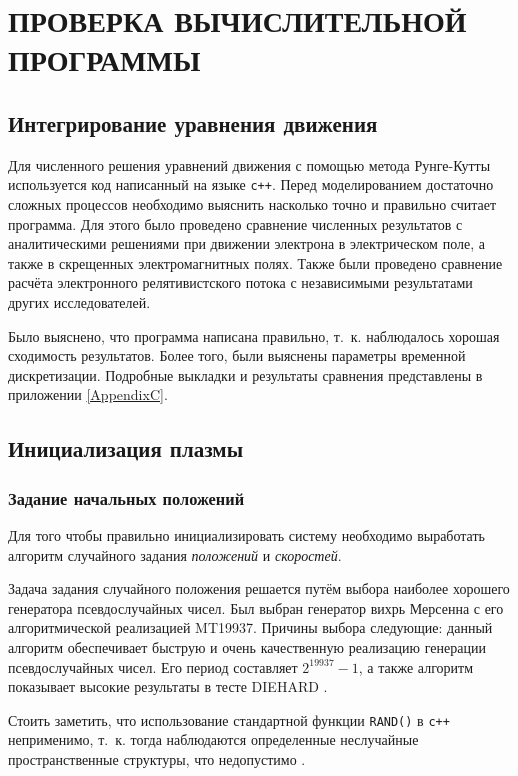 \chapter{ПРОВЕРКА ВЫЧИСЛИТЕЛЬНОЙ ПРОГРАММЫ} \label{ch4}

\section{Интегрирование уравнения движения}

Для численного решения уравнений движения с помощью метода Рунге-Кутты используется код написанный на языке \texttt{c++}.
Перед моделированием достаточно сложных процессов необходимо выяснить насколько точно и правильно считает программа. Для этого было проведено сравнение численных результатов с аналитическими решениями при движении электрона в электрическом поле, а также в скрещенных электромагнитных полях. Также были проведено сравнение расчёта электронного релятивистского потока с независимыми результатами других исследователей.

Было выяснено, что программа написана правильно, т.~к. наблюдалось хорошая сходимость результатов. Более того, были выяснены параметры временной дискретизации. Подробные выкладки и результаты сравнения представлены в приложении \ref{AppendixC}. 



\section{Инициализация плазмы}

\subsection{Задание начальных положений}
\label{sec:MT19937}

Для того чтобы правильно инициализировать систему необходимо выработать алгоритм случайного задания \textit{положений} и \textit{скоростей}. 

Задача задания случайного положения решается путём выбора наиболее хорошего генератора псевдослучайных чисел. Был выбран генератор вихрь Мерсенна с его алгоритмической реализацией MT19937. Причины выбора следующие: данный алгоритм обеспечивает быструю и очень качественную реализацию генерации псевдослучайных чисел. Его период составляет $2^{19937}-1$, а также алгоритм показывает высокие результаты в тесте DIEHARD \cite{matsumoto1998mersenne,sriram2006area}.

Стоить заметить, что использование стандартной функции \texttt{RAND()} в \texttt{c++} неприменимо, т.~к. тогда наблюдаются определенные неслучайные пространственные структуры, что недопустимо \cite{habr_rand}.

